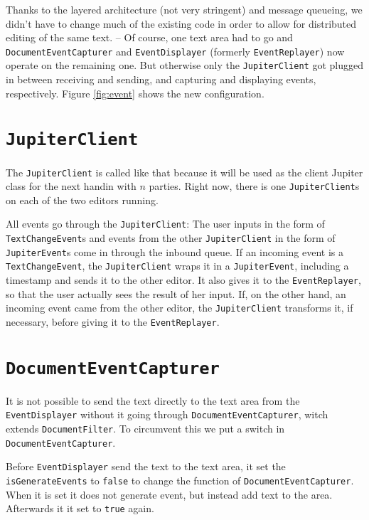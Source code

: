 \documentclass[a4paper,final,12pt,oneside,article,table]{memoir}
\newcommand{\srcpath}{../ex09/src/main/java/ddist}
\newcommand{\inmnt}[3]{\vspace{1em}\noindent\texttt{\color{gray}File: #3}\vspace{-1em}\inputminted[tabsize=4,firstline=#1,firstnumber=#1,lastline=#2,linenos]{java}{\srcpath/#3}}
\newcommand{\mil}[1]{\texttt{#1}}
\begin{document}
Thanks to the layered architecture (not very stringent) and message
queueing, we didn't have to change much of the existing code in order to
allow for distributed editing of the same text. -- Of course, one text
area had to go and \mil{DocumentEventCapturer} and \mil{EventDisplayer}
(formerly \mil{EventReplayer}) now operate on the remaining one.
But otherwise only the \mil{JupiterClient} got plugged in between
receiving and sending, and capturing and displaying events,
respectively. Figure \ref{fig:event} shows the new configuration.


\section{\mil{JupiterClient}}

The \mil{JupiterClient} is called like that because it will be used as
the client Jupiter class for the next handin with $n$ parties. Right
now, there is one \mil{JupiterClient}s on each of the two editors
running.

All events go through the \mil{JupiterClient}: The user inputs in the
form of \mil{TextChangeEvent}s and events from the other
\mil{JupiterClient} in the form of \mil{JupiterEvent}s come in through
the inbound queue.  If an incoming event is a \mil{TextChangeEvent}, the
\mil{JupiterClient} wraps it in a \mil{JupiterEvent}, including a
timestamp and sends it to the other editor. It also gives it to the
\mil{EventReplayer}, so that the user actually sees the result of her
input. If, on the other hand, an incoming event came from the other
editor, the \mil{JupiterClient} transforms it, if necessary, before
giving it to the \mil{EventReplayer}.

\section{\mil{DocumentEventCapturer}}
It is not possible to send the text directly to the text area from the
\mil{EventDisplayer} without it going through
\mil{DocumentEventCapturer}, witch extends \mil{DocumentFilter}. To
circumvent this we put a switch in \mil{DocumentEventCapturer}.

Before \mil{EventDisplayer} send the text to the text area, it set the
\mil{isGenerateEvents} to \mil{false} to change the function of
\mil{DocumentEventCapturer}. When it is set it does not generate
event, but instead add text to the area. Afterwards it it set to
\mil{true} again.
\end{document}
